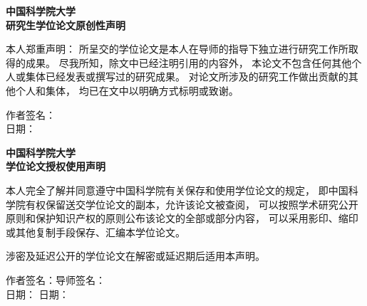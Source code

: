 
\vspace*{-4em}\vspace*{\fill}
\begin{center}%
	\heiti\bfseries{}
	中国科学院大学\\研究生学位论文原创性声明%
\end{center}

本人郑重声明：
所呈交的学位论文是本人在导师的指导下独立进行研究工作所取得的成果。
尽我所知，除文中已经注明引用的内容外，
本论文不包含任何其他个人或集体已经发表或撰写过的研究成果。
对论文所涉及的研究工作做出贡献的其他个人和集体，
均已在文中以明确方式标明或致谢。

\begin{flushright}
	作者签名：\hspace{8em}\mbox{}\\
	日期：\hspace{2\ccwd}\hspace{8em}\mbox{}%
\end{flushright}

\begin{center}
	\heiti\bfseries{}
	中国科学院大学\\学位论文授权使用声明%
\end{center}

本人完全了解并同意遵守中国科学院有关保存和使用学位论文的规定，
即中国科学院有权保留送交学位论文的副本，允许该论文被查阅，
可以按照学术研究公开原则和保护知识产权的原则公布该论文的全部或部分内容，
可以采用影印、缩印或其他复制手段保存、汇编本学位论文。\par
涉密及延迟公开的学位论文在解密或延迟期后适用本声明。

\begin{flushright}
	作者签名：\hspace{8em}导师签名：\hspace{8em}\mbox{}\\
	日期：\hspace{2\ccwd}\hspace{8em}%
	日期：\hspace{2\ccwd}\hspace{8em}\mbox{}\\
\end{flushright}
\vspace*{\fill}

